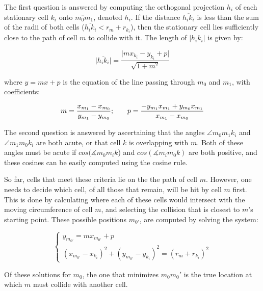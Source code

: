 \documentclass[12pt]{article}
\begin{document}
The first question is answered by computing the orthogonal projection \(h_i\) of 
each stationary cell \(k_i\) onto \(\overleftrightarrow{m_0m_1}\), denoted 
\(h_i\). If the distance \(\overline{h_ik_i}\) is less than the sum of the 
radii of both cells (\(\overline{h_ik_i} < r_m + r_{k_i}\)), then the 
stationary cell lies sufficiently close to the path of cell \(m\) to collide 
with it. The length of \(\lvert h_ik_i \rvert\) is given by:

\begin{equation}
\lvert\overline{h_ik_i}\rvert = \frac{\lvert {mx_{k_i} - y_{k_i} + p}\rvert }{\sqrt{1+m^2}}
\end{equation}

where \(y = mx + p\) is the equation of the line passing through \(m_0\)
and \(m_1\), with coefficients:

\begin{equation}
  m = \frac{x_{m_1}-x_{m_0}}{y_{m_1}-y_{m_0}}\text; \qquad p = \frac{-y_{m_1}x_{m_1}+y_{m_0}x_{m_1}}{x_{m_1}-x_{m_0}}
\end{equation}

The second question is answered by ascertaining that the angles \(\angle m_0m_1k_i\) 
and \(\angle m_1m_0k_i\) are both acute, or that 
cell \(k\) is overlapping with \(m\). Both of these angles 
must be acute if \(cos(\measuredangle m_0m_ik\)) and \(cos(\measuredangle m_im_0k)\) are 
both positive, and these cosines can be easily computed 
using the cosine rule.

So far, cells that meet these criteria lie on the the path of cell 
\(m\). However, one needs to decide which cell, of all those 
that remain, will be hit by cell \(m\) first. This is done by 
calculating where each of these cells would intersect with the moving 
circumference of cell \(m\), and selecting the collision that is closest to 
\(m\)'s starting point. These possible positions \(m_{0'}\), 
are computed by solving the system:

\begin{equation}
  \begin{cases} 
    y_{m_{0'}} = mx_{m_{0'}} + p \\
    (x_{m_{0'}} - x_{k_i})^2 + (y_{m_{0'}}-y_{k_i})^2 =  (r_m+r_{k_i})^2
  \end{cases}
\end{equation}

Of these solutions for \(m_0\), the one that minimizes \(m_0m_0'\) 
is the true location at which \(m\) must collide with another 
cell. 
\end{document}
